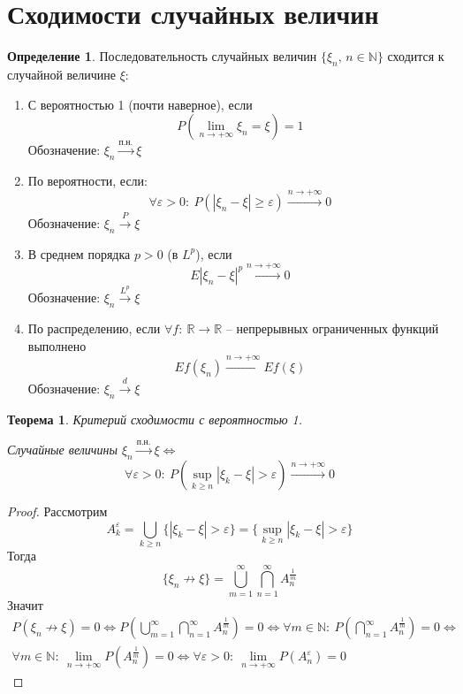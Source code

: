 \documentclass[a4paper,12pt]{article}
\renewcommand{\geq}{\ensuremath{\geqslant}}
\theoremstyle{plain}
\newtheorem{theorem}{Теорема}[section]
\theoremstyle{definition}
\newtheorem{definition}{Определение}[section]
\theoremstyle{remark}
\begin{document}
\section{Сходимости случайных величин}
\begin{definition}
	Последовательность случайных величин $\{\xi_n,\, n \in \mathbb{N}\}$ сходится к случайной величине $\xi$:
	\begin{enumerate}
		\item С вероятностью 1 (почти наверное), если
		      \[P\left(\lim_{n \to +\infty}\xi_n = \xi\right) = 1\]
		      Обозначение: $\xi_n \stackrel{\text{п.н.}}{\to} \xi$

		\item По вероятности, если:
		      \[\forall \varepsilon > 0 :\: P(|\xi_n - \xi| \geq \varepsilon) \stackrel{n \to +\infty}{\to} 0\]
		      Обозначение: $\xi_n \stackrel{P}{\to} \xi$

		\item В среднем порядка $p > 0$ (в $L^p$), если
		      \[E|\xi_n - \xi|^p \stackrel{n \to +\infty}{\to} 0 \]
		      Обозначение: $\xi_n \stackrel{L^p}{\to} \xi$

		\item По распределению, если $\forall f:\: \mathbb{R} \to \mathbb{R}$ -- непрерывных ограниченных функций выполнено
		      \[Ef(\xi_n) \stackrel{n \to +\infty}{\to} Ef(\xi)\]
		      Обозначение: $\xi_n \stackrel{d}{\to} \xi$
	\end{enumerate}
\end{definition}

\begin{theorem}
	Критерий сходимости с вероятностью 1.

	Случайные величины $\xi_n \stackrel{\text{п.н.}}{\to} \xi \Leftrightarrow$
	\[\forall \varepsilon > 0:\: P\left(\sup_{k \geq n} |\xi_k - \xi| > \varepsilon\right) \stackrel{n \to +\infty}{\to} 0\]
\end{theorem}

\begin{proof}
	Рассмотрим
	\[A_k^\varepsilon = \bigcup_{k \geq n}\{|\xi_k - \xi| > \varepsilon\} = \{\sup_{k \geq n} |\xi_k - \xi| > \varepsilon \}\]
	Тогда
	\[\{\xi_n \not\to \xi\} = \bigcup_{m = 1}^\infty \bigcap_{n = 1}^\infty A_n^{\frac{1}{m}}\]
	Значит
	\begin{align*}
		P(\xi_n \not\to \xi) = 0 \Leftrightarrow P\left(\bigcup_{m = 1}^\infty \bigcap_{n = 1}^\infty A_n^{\frac{1}{m}}\right) = 0 \Leftrightarrow \forall m \in \mathbb{N} :\: P\left(\bigcap_{n = 1}^\infty A_n^{\frac{1}{m}}\right) = 0 \Leftrightarrow \\
		\forall m \in \mathbb{N}:\: \lim_{n \to +\infty} P\left(A_n^{\frac{1}{m}}\right) = 0 \Leftrightarrow \forall \varepsilon > 0:\: \lim_{n \to +\infty}P(A_n^\varepsilon) = 0
	\end{align*}
\end{proof}
\end{document}
